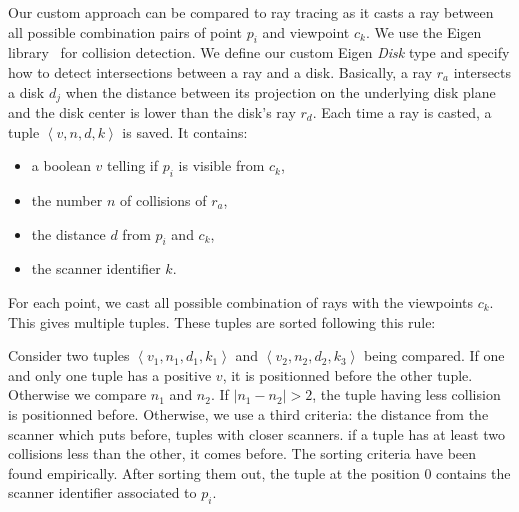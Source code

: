 Our custom approach can be compared to ray tracing as it casts a ray between all possible combination pairs of point $p_i$ and viewpoint $c_k$. We use the Eigen library~\cite{eigenweb} for collision detection. We define our custom Eigen \emph{Disk} type and specify how to detect intersections between a ray and a disk. Basically, a ray $r_a$ intersects a disk $d_j$ when the distance between its projection on the underlying disk plane and the disk center is lower than the
disk's ray $r_d$. Each time a ray is casted, a tuple $\left\langle v, n, d, k \right\rangle$ is saved. It contains:
\begin{itemize}
  \item a boolean $v$ telling if $p_i$ is visible from $c_k$,
  \item the number $n$ of collisions of $r_a$,
  \item the distance $d$ from $p_i$ and $c_k$,
  \item the scanner identifier $k$.
\end{itemize}

For each point, we cast all possible combination of rays with the viewpoints $c_k$. This gives multiple tuples. These tuples are sorted following this rule:

Consider two tuples $\left\langle v_1, n_1, d_1, k_1 \right\rangle$ and $\left \langle v_2, n_2, d_2, k_3 \right\rangle$ being compared. If one and only one tuple has a positive $v$, it is positionned before the other tuple. Otherwise we compare $n_1$ and $n_2$. If $ | n_1 - n_2 | > 2 $, the tuple having less collision is positionned before. Otherwise, we use a third criteria: the distance from the scanner which puts before, tuples with closer scanners. if a tuple has at least two collisions less than the other, it comes before. The sorting criteria have been found empirically. After sorting them out, the tuple at the position $0$ contains the scanner identifier associated to $p_i$.

